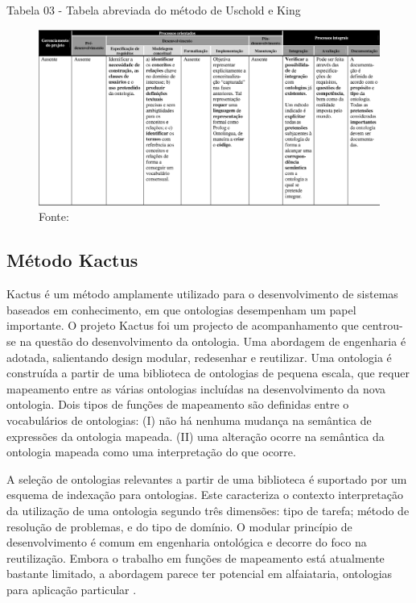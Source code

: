 \documentclass[a4paper]{report}
\begin{document}
\pagebreak
Tabela 03 - Tabela abreviada do método de Uschold e King

\begin{figure}[h] 
\centering %
\includegraphics[scale=0.4]{Figuras/6.png} %
\caption{Fonte: \cite{DanielaLucas:2008}}
\end{figure}

\subsection{Método Kactus} 
\qquad Kactus é um método amplamente utilizado para o desenvolvimento de sistemas baseados em conhecimento, em que ontologias desempenham um papel importante. O projeto Kactus foi um projecto de acompanhamento que centrou-se na questão do desenvolvimento da ontologia. Uma abordagem de engenharia é adotada, salientando design modular, redesenhar e reutilizar. Uma ontologia é construída a partir de uma biblioteca de ontologias de pequena escala, que requer mapeamento entre as várias ontologias incluídas na desenvolvimento da nova ontologia. Dois tipos de funções de mapeamento são definidas entre o vocabulários de ontologias:
(I) não há nenhuma mudança na semântica de expressões da ontologia mapeada.
(II) uma alteração ocorre na semântica da ontologia mapeada como uma interpretação do que ocorre.

A seleção de ontologias relevantes a partir de uma biblioteca é suportado por um esquema de indexação para ontologias. Este caracteriza o contexto interpretação da utilização de uma ontologia segundo três dimensões: tipo de tarefa; método de resolução de problemas, e do tipo de domínio. O modular princípio de desenvolvimento é comum em engenharia ontológica e decorre do foco na reutilização. Embora o trabalho em funções de mapeamento está atualmente bastante limitado, a abordagem parece ter potencial em alfaiataria, ontologias para aplicação particular \cite{VariosAutores:2009}. 
\end{document}

